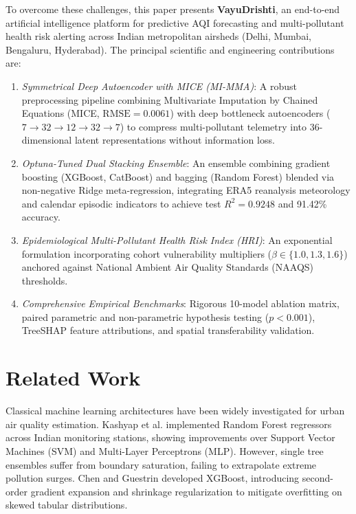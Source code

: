 \documentclass[conference]{IEEEtran}
\begin{document}
To overcome these challenges, this paper presents \textbf{VayuDrishti}, an end-to-end artificial intelligence platform for predictive AQI forecasting and multi-pollutant health risk alerting across Indian metropolitan airsheds (Delhi, Mumbai, Bengaluru, Hyderabad). The principal scientific and engineering contributions are:
\begin{enumerate}
    \item \textit{Symmetrical Deep Autoencoder with MICE (MI-MMA)}: A robust preprocessing pipeline combining Multivariate Imputation by Chained Equations (MICE, $\text{RMSE} = 0.0061$) with deep bottleneck autoencoders ($7 \to 32 \to 12 \to 32 \to 7$) to compress multi-pollutant telemetry into 36-dimensional latent representations without information loss.
    \item \textit{Optuna-Tuned Dual Stacking Ensemble}: An ensemble combining gradient boosting (XGBoost, CatBoost) and bagging (Random Forest) blended via non-negative Ridge meta-regression, integrating ERA5 reanalysis meteorology and calendar episodic indicators to achieve test $R^2 = 0.9248$ and 91.42\% accuracy.
    \item \textit{Epidemiological Multi-Pollutant Health Risk Index (HRI)}: An exponential formulation incorporating cohort vulnerability multipliers ($\beta \in \{1.0, 1.3, 1.6\}$) anchored against National Ambient Air Quality Standards (NAAQS) thresholds.
    \item \textit{Comprehensive Empirical Benchmarks}: Rigorous 10-model ablation matrix, paired parametric and non-parametric hypothesis testing ($p < 0.001$), TreeSHAP feature attributions, and spatial transferability validation.
\end{enumerate}

\section{Related Work}
Classical machine learning architectures have been widely investigated for urban air quality estimation. Kashyap et al. \cite{kashyap2023} implemented Random Forest regressors across Indian monitoring stations, showing improvements over Support Vector Machines (SVM) and Multi-Layer Perceptrons (MLP). However, single tree ensembles suffer from boundary saturation, failing to extrapolate extreme pollution surges. Chen and Guestrin \cite{chen2016} developed XGBoost, introducing second-order gradient expansion and shrinkage regularization to mitigate overfitting on skewed tabular distributions.
\end{document}

